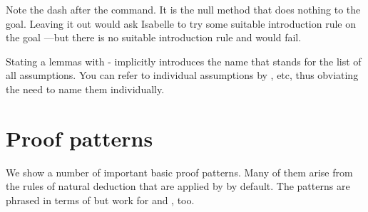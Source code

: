 \begin{isabellebody}
\begin{isamarkuptext}
\begin{warn}
Note the dash after the 
command.  It is the null method that does nothing to the goal. Leaving it out
would ask Isabelle to try some suitable introduction rule on the goal ---but there is no suitable introduction rule and 
would fail.
\end{warn}

Stating a lemmas with - implicitly introduces the
name  that stands for the list of all assumptions. You can refer
to individual assumptions by ,  etc,
thus obviating the need to name them individually.

\section{Proof patterns}

We show a number of important basic proof patterns. Many of them arise from
the rules of natural deduction that are applied by  by
default. The patterns are phrased in terms of  but work for
 and , too.


\end{isamarkuptext}
\end{isabellebody}
